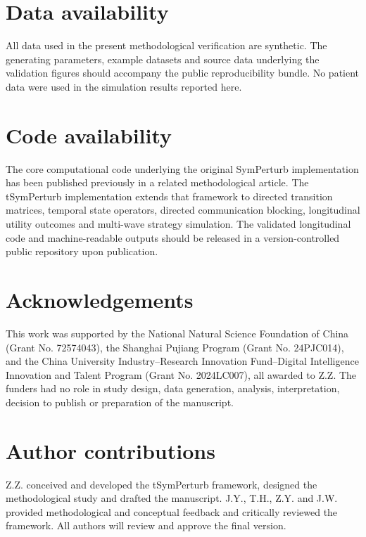 \documentclass[11pt]{article}
\begin{document}
\section*{Data availability}\label{data-availability}

All data used in the present methodological verification are synthetic.
The generating parameters, example datasets and source data underlying
the validation figures should accompany the public reproducibility
bundle. No patient data were used in the simulation results reported
here.

\section*{Code availability}\label{code-availability}

The core computational code underlying the original SymPerturb
implementation has been published previously in a related methodological
article. The tSymPerturb implementation extends that framework to
directed transition matrices, temporal state operators, directed
communication blocking, longitudinal utility outcomes and multi-wave
strategy simulation. The validated longitudinal code and
machine-readable outputs should be released in a version-controlled
public repository upon publication.

\section*{Acknowledgements}\label{acknowledgements}

This work was supported by the National Natural Science Foundation of
China (Grant No. 72574043), the Shanghai Pujiang Program (Grant No.
24PJC014), and the China University Industry--Research Innovation
Fund--Digital Intelligence Innovation and Talent Program (Grant No.
2024LC007), all awarded to Z.Z. The funders had no role in study design,
data generation, analysis, interpretation, decision to publish or
preparation of the manuscript.

\section*{Author contributions}\label{author-contributions}

Z.Z. conceived and developed the tSymPerturb framework, designed the
methodological study and drafted the manuscript. J.Y., T.H., Z.Y. and
J.W. provided methodological and conceptual feedback and critically
reviewed the framework. All authors will review and approve the final
version.
\end{document}
